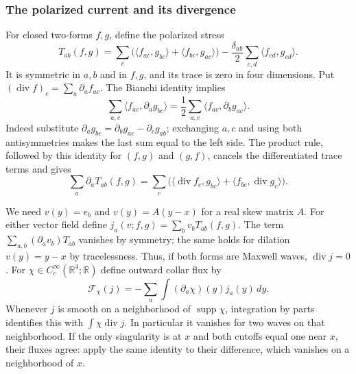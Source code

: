 \subsubsection{The polarized current and its divergence}
For closed two-forms $f,g$, define the polarized stress
\[
 T_{ab}(f,g)=\sum_c\bigl(\langle f_{ac},g_{bc}\rangle
                   +\langle f_{bc},g_{ac}\rangle\bigr)
       -\frac{\delta_{ab}}2\sum_{c,d}\langle f_{cd},g_{cd}\rangle.
\]
It is symmetric in $a,b$ and in $f,g$, and its trace is zero in
four dimensions. Put $(\operatorname{div}f)_c=\sum_a\partial_af_{ac}$.
The Bianchi identity implies
\[
 \sum_{a,c}\langle f_{ac},\partial_ag_{bc}\rangle
       =\frac12\sum_{a,c}\langle f_{ac},\partial_bg_{ac}\rangle.
\]
Indeed substitute
$\partial_ag_{bc}=\partial_bg_{ac}-\partial_cg_{ab}$; exchanging
$a,c$ and using both antisymmetries makes the last sum equal to the
left side. The product rule, followed by this identity for $(f,g)$
and $(g,f)$, cancels the differentiated trace terms and gives
\begin{equation}\label{eq:maxwell-stress-divergence}
 \sum_a\partial_aT_{ab}(f,g)
 =\sum_c\bigl(\langle\operatorname{div}f_c,g_{bc}\rangle
                  +\langle f_{bc},\operatorname{div}g_c\rangle\bigr).
\end{equation}

We need $v(y)=e_b$ and $v(y)=A(y-x)$ for a real skew matrix $A$.
For either vector field define $j_a(v;f,g)=\sum_bv_bT_{ab}(f,g)$.
The term $\sum_{a,b}(\partial_av_b)T_{ab}$ vanishes by symmetry;
the same holds for dilation $v(y)=y-x$ by tracelessness.
Thus, if both forms are Maxwell waves, $\operatorname{div}j=0$.
For $\chi\in C_c^\infty(\mathbb R^4;\mathbb R)$ define outward
collar flux by
\begin{equation}\label{eq:maxwell-collar-flux}
          \mathcal F_\chi(j)=-\sum_a\int(\partial_a\chi)(y)j_a(y)\,dy.
\end{equation}
Whenever $j$ is smooth on a neighborhood of $\operatorname{supp}\chi$,
integration by parts identifies this with $\int\chi\operatorname{div}j$.
In particular it vanishes for two waves on that neighborhood.
If the only singularity is at $x$ and both cutoffs equal one near $x$,
their fluxes agree: apply the same identity to their difference, which
vanishes on a neighborhood of $x$.

